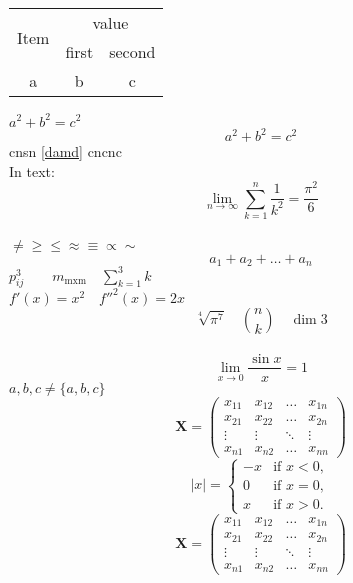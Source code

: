 \documentclass[UTF8]{ctexart}
\begin{document}
\begin{tabular}{ccc}
\hline
\multirow{2}{*}{Item} &\multicolumn{2}{c}{value} \\
\cline{2-3}
&first & second \\
a &b &c \\
\hline
\end{tabular}
$a^2+b^2=c^2$
\begin{equation}
a^2+b^2=c^2 \tag{123}\label{damd}
\end{equation}
cnsn \eqref{damd} cncnc \\
In text:
\[\lim_{n\to\infty} \sum_{k=1}^n \frac{1}{k^2}=\frac{\pi^2}{6}\] \\
$ \ne \ge \le \approx \equiv \propto \sim $  \\
\[a_1+a_2+\dots+a_n\]
$p_{ij}^3 \qquad m_{\text{mxm}}\quad \sum_{k=1}^3 k$\\
$f'(x)=x^2\quad f''^2(x)=2x$
\[\sqrt[4]{\pi^7} \quad \binom{n}{k}\quad \dim{3}\]\\
\[\lim_{x \rightarrow 0}\frac{\sin x}{x}=1\]
$ a,b,c \ne \{ a,b,c\} $
\[ \mathbf{X}= \left( \begin{array}{cccc}
x_{11} & x_{12} &\ldots &x_{1n} \\
x_{21} & x_{22} &\ldots &x_{2n} \\
\vdots & \vdots &\ddots &\vdots \\
x_{n1} & x_{n2} &\ldots &x_{nn}
\end{array} \right) \]
\[ |x|=\left\{  \begin{array}{lr}
-x & \text{if } x<0,\\
0 &\text{if } x=0,\\
x &\text{if } x>0.
\end{array}\right. \]
\[ \mathbf{X}=\begin{pmatrix}
x_{11} & x_{12} &\ldots &x_{1n} \\
x_{21} & x_{22} &\ldots &x_{2n} \\
\vdots & \vdots &\ddots &\vdots \\
x_{n1} & x_{n2} &\ldots &x_{nn}
\end{pmatrix} \]

\end{document}
